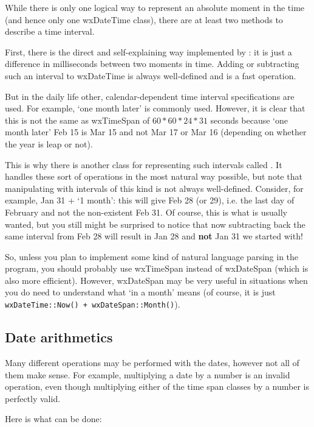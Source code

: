 While there is only one logical way to represent an absolute moment in the
time (and hence only one wxDateTime class), there are at least two methods to
describe a time interval.

First, there is the direct and self-explaining way implemented by 
: it is just a difference in milliseconds
between two moments in time. Adding or subtracting such an interval to
wxDateTime is always well-defined and is a fast operation.

But in the daily life other, calendar-dependent time interval specifications are
used. For example, `one month later' is commonly used. However, it is clear
that this is not the same as wxTimeSpan of $60*60*24*31$ seconds because `one
month later' Feb 15 is Mar 15 and not Mar 17 or Mar 16 (depending on whether
the year is leap or not).

This is why there is another class for representing such intervals called 
. It handles these sort of operations in the
most natural way possible, but note that manipulating with intervals of
this kind is not always well-defined. Consider, for example, Jan 31 + `1
month': this will give Feb 28 (or 29), i.e. the last day of February and not
the non-existent Feb 31. Of course, this is what is usually wanted, but you
still might be surprised to notice that now subtracting back the same
interval from Feb 28 will result in Jan 28 and {\bf not} Jan 31 we started
with!

So, unless you plan to implement some kind of natural language parsing in the
program, you should probably use wxTimeSpan instead of wxDateSpan (which is
also more efficient). However, wxDateSpan may be very useful in situations
when you do need to understand what `in a month' means (of course, it is
just {\tt wxDateTime::Now() + wxDateSpan::Month()}).

\subsection{Date arithmetics}\label{tdatearithm}

Many different operations may be performed with the dates, however not all of
them make sense. For example, multiplying a date by a number is an invalid
operation, even though multiplying either of the time span classes by a number
is perfectly valid.

Here is what can be done:

